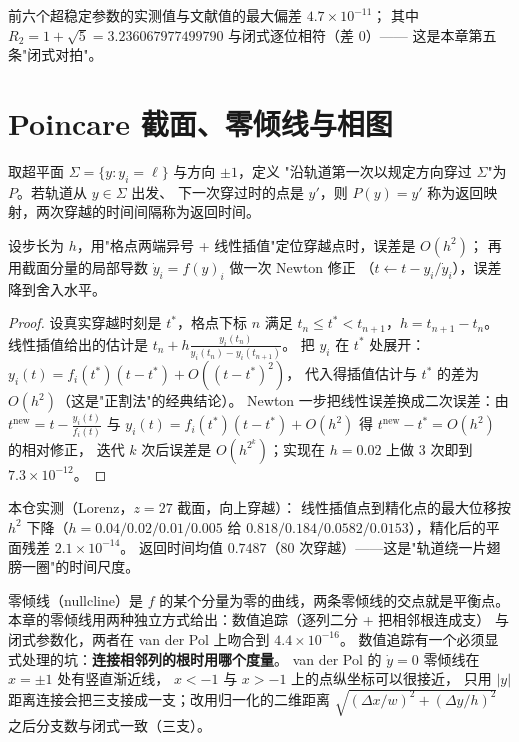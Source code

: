 前六个超稳定参数的实测值与文献值的最大偏差 $4.7\times10^{-11}$；
其中 $R_2=1+\sqrt5=3.236067977499790$ 与闭式逐位相符（差 $0$）——
这是本章第五条"闭式对拍"。

\section{Poincare 截面、零倾线与相图}

\begin{definition}
取超平面 $\Sigma=\{y:y_{i}=\ell\}$ 与方向 $\pm1$，定义
"沿轨道第一次以规定方向穿过 $\Sigma$"为 $P$。若轨道从 $y\in\Sigma$ 出发、
下一次穿过时的点是 $y'$，则 $P(y)=y'$ 称为返回映射，两次穿越的时间间隔称为返回时间。
\end{definition}

\begin{theorem}[截面上点的定位误差]
\label{thm:poincare}
设步长为 $h$，用"格点两端异号 + 线性插值"定位穿越点时，误差是 $O(h^2)$；
再用截面分量的局部导数 $\dot y_i=f(y)_{i}$ 做一次 Newton 修正
（$t\leftarrow t-y_i/\dot y_i$），误差降到舍入水平。
\end{theorem}

\begin{proof}
设真实穿越时刻是 $t^\ast$，格点下标 $n$ 满足 $t_n\le t^\ast<t_{n+1}$，$h=t_{n+1}-t_n$。
线性插值给出的估计是 $t_n+h\frac{y_i(t_n)}{y_i(t_n)-y_i(t_{n+1})}$。
把 $y_i$ 在 $t^\ast$ 处展开：$y_i(t)=f_i(t^\ast)(t-t^\ast)+O((t-t^\ast)^2)$，
代入得插值估计与 $t^\ast$ 的差为 $O(h^2)$（这是"正割法"的经典结论）。
Newton 一步把线性误差换成二次误差：由 $t^{\text{new}}=t-\frac{y_i(t)}{f_i(t)}$ 与
$y_i(t)=f_i(t^\ast)(t-t^\ast)+O(h^2)$ 得
$t^{\text{new}}-t^\ast=O(h^2)$ 的相对修正，
迭代 $k$ 次后误差是 $O(h^{2^k})$；实现在 $h=0.02$ 上做 $3$ 次即到 $7.3\times10^{-12}$。
\end{proof}

本仓实测（Lorenz，$z=27$ 截面，向上穿越）：
线性插值点到精化点的最大位移按 $h^2$ 下降（$h=0.04/0.02/0.01/0.005$ 给
$0.818/0.184/0.0582/0.0153$），精化后的平面残差 $2.1\times10^{-14}$。
返回时间均值 $0.7487$（$80$ 次穿越）——这是"轨道绕一片翅膀一圈"的时间尺度。

零倾线（nullcline）是 $f$ 的某个分量为零的曲线，两条零倾线的交点就是平衡点。
本章的零倾线用两种独立方式给出：数值追踪（逐列二分 + 把相邻根连成支）
与闭式参数化，两者在 van der Pol 上吻合到 $4.4\times10^{-16}$。
数值追踪有一个必须显式处理的坑：\textbf{连接相邻列的根时用哪个度量}。
van der Pol 的 $\dot y=0$ 零倾线在 $x=\pm1$ 处有竖直渐近线，
$x<-1$ 与 $x>-1$ 上的点纵坐标可以很接近，
只用 $|y|$ 距离连接会把三支接成一支；改用归一化的二维距离
$\sqrt{(\Delta x/w)^2+(\Delta y/h)^2}$ 之后分支数与闭式一致（三支）。

